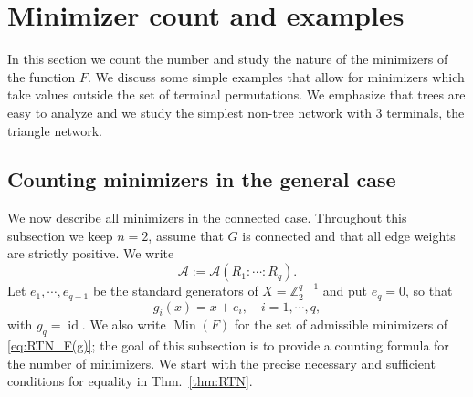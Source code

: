 \documentclass[11pt,oneside,letterpaper]{article}
\numberwithin{equation}{section}
\theoremstyle{definition}
\theoremstyle{remark}
\DeclareMathOperator{\id}{id}
\begin{document}
\section{Minimizer count and examples}
\label{sec:minimizer}

In this section we count the number and study the nature of the minimizers of the function $F$. We discuss some simple examples that allow for minimizers which take values outside the set of terminal permutations. We emphasize that trees are easy to analyze and we study the simplest non-tree network with 3 terminals, the triangle network.

\subsection{Counting minimizers in the general case}

We now describe all minimizers in the connected case.  Throughout this
subsection we keep $n=2$, assume that $G$ is connected and that all edge
weights are strictly positive.  We write
\begin{equation}
  \mathcal{A}:=\mathcal{A}(R_1:\cdots:R_q).
\end{equation}
Let $e_1,\cdots,e_{q-1}$ be the standard generators of
$X=\mathbb{Z}_2^{q-1}$ and put $e_q=0$, so that
\begin{equation}
  g_i(x)=x+e_i,\quad i=1,\cdots,q,
\end{equation}
with $g_q=\id$.  We also write $\operatorname{Min}(F)$ for the set of
admissible minimizers of \eqref{eq:RTN_F(g)}; the goal of this
subsection is to provide a counting formula for the number of minimizers. We start with the precise necessary and sufficient conditions for equality in Thm.~\ref{thm:RTN}.
\end{document}

